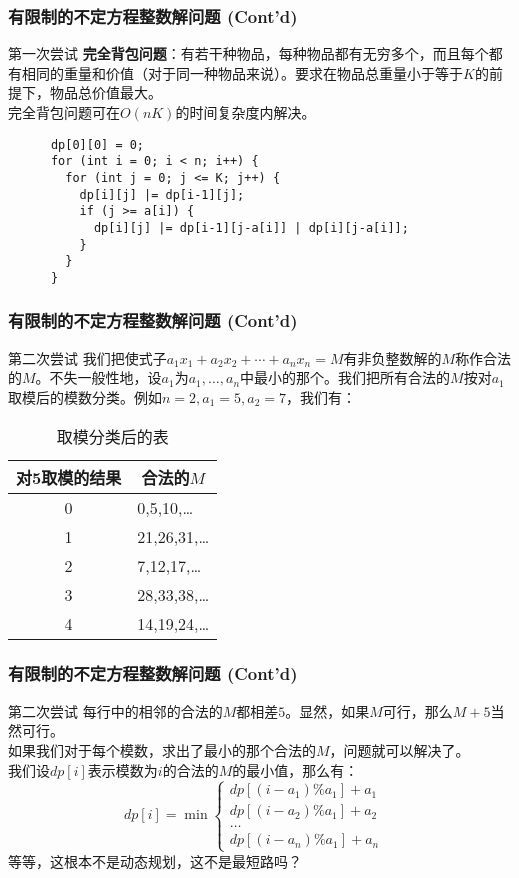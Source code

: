 \documentclass[hyperref={unicode=true}]{beamer}
\begin{document}
\begin{frame}[fragile]\frametitle{有限制的不定方程整数解问题 (Cont'd)}
  \begin{alertblock}{第一次尝试}
    {\bf 完全背包问题}：有若干种物品，每种物品都有无穷多个，而且每个都有相同的重量和价值（对于同一种物品来说）。要求在物品总重量小于等于$K$的前提下，物品总价值最大。\\
    完全背包问题可在$O(nK)$的时间复杂度内解决。\\
    \begin{verbatim}
      dp[0][0] = 0;
      for (int i = 0; i < n; i++) {
        for (int j = 0; j <= K; j++) {
          dp[i][j] |= dp[i-1][j];
          if (j >= a[i]) {
            dp[i][j] |= dp[i-1][j-a[i]] | dp[i][j-a[i]];
          }
        }
      }
    \end{verbatim}
  \end{alertblock}
\end{frame}
\begin{frame}[fragile]\frametitle{有限制的不定方程整数解问题 (Cont'd)}
  \begin{alertblock}{第二次尝试}
    我们把使式子$a_1x_1+a_2x_2+ \cdots + a_n x_n=M$有非负整数解的$M$称作合法的$M$。不失一般性地，设$a_1$为$a_1,\ldots,a_n$中最小的那个。我们把所有合法的$M$按对$a_1$取模后的模数分类。例如$n=2,a_1=5,a_2=7$，我们有：
    \begin{table}[H]
      \centering
      \caption{取模分类后的表}\label{table:div}
      \begin{tabular}{c@{}ccc}
        \toprule
        对5取模的结果 & \multicolumn{3}{|c}{合法的$M$}          \\ \midrule
        0       & \multicolumn{3}{|l}{0,5,10,\ldots}   \\
        1       & \multicolumn{3}{|l}{21,26,31,\ldots} \\
        2       & \multicolumn{3}{|l}{7,12,17,\ldots}  \\
        3       & \multicolumn{3}{|l}{28,33,38,\ldots} \\
        4       & \multicolumn{3}{|l}{14,19,24,\ldots}  \\ \bottomrule
      \end{tabular}
    \end{table}
  \end{alertblock}
\end{frame}
\begin{frame}[fragile]\frametitle{有限制的不定方程整数解问题 (Cont'd)}
  \begin{alertblock}{第二次尝试}
    每行中的相邻的合法的$M$都相差$5$。显然，如果$M$可行，那么$M+5$当然可行。\\
    如果我们对于每个模数，求出了最小的那个合法的$M$，问题就可以解决了。\\
    我们设$dp[i]$表示模数为$i$的合法的$M$的最小值，那么有：
    \[dp[i] = \min\begin{cases}
    dp[(i-a_1)\%a_1]+a_1 &\\
    dp[(i-a_2)\%a_1]+a_2 &\\
    \ldots &\\
    dp[(i-a_n)\%a_1]+a_n&
    \end{cases}\]
    等等，这根本不是动态规划，这不是最短路吗？
  \end{alertblock}
\end{frame}
\end{document}
